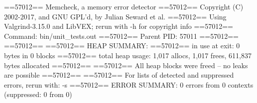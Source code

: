 ==57012== Memcheck, a memory error detector
==57012== Copyright (C) 2002-2017, and GNU GPL'd, by Julian Seward et al.
==57012== Using Valgrind-3.15.0 and LibVEX; rerun with -h for copyright info
==57012== Command: bin/unit_tests.out
==57012== Parent PID: 57011
==57012== 
==57012== 
==57012== HEAP SUMMARY:
==57012==     in use at exit: 0 bytes in 0 blocks
==57012==   total heap usage: 1,017 allocs, 1,017 frees, 611,837 bytes allocated
==57012== 
==57012== All heap blocks were freed -- no leaks are possible
==57012== 
==57012== For lists of detected and suppressed errors, rerun with: -s
==57012== ERROR SUMMARY: 0 errors from 0 contexts (suppressed: 0 from 0)
